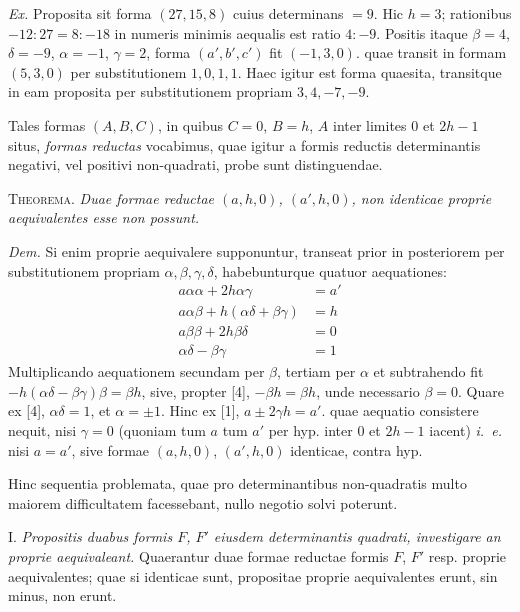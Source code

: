 \textit{Ex.} Proposita sit forma $(27,15,8)$ cuius determinans $=9$. Hic $h=3$; rationibus $-12:27=8:-18$ in numeris minimis aequalis est ratio $4:-9$. Positis itaque $\beta=4$, $\delta=-9$, $\alpha=-1$, $\gamma=2$, forma $(a',b',c')$ fit $(-1,3,0)$. quae transit in formam $(5,3,0)$ per substitutionem $1,0,1,1$. Haec igitur est
forma quaesita, transitque in eam proposita per substitutionem propriam $3,4,-7,-9$.

Tales formas $(A,B,C)$, in quibus $C=0$, $B=h$, $A$ inter limites $0$ et $2h-1$ situs, \textit{formas reductas} vocabimus, quae igitur a formis reductis determinantis negativi, vel positivi non-quadrati, probe sunt distinguendae.

\textsc{Theorema.} \textit{Duae formae reductae $(a,h,0)$, $(a',h,0)$, non identicae proprie aequivalentes esse non possunt.}

\textit{Dem.} Si enim proprie aequivalere supponuntur, transeat prior in posteriorem per substitutionem propriam $\alpha,\beta,\gamma,\delta$, habebunturque quatuor aequationes:
\begin{align*}
a\alpha\alpha+2h\alpha\gamma&=a'\tag*{. . . . . . . . . [1]}\\
a\alpha\beta+h(\alpha\delta+\beta\gamma)&=h\tag*{. . . . . . . [2]}\\
a\beta\beta+2h\beta\delta&=0\tag*{. . . . . . . . . . [3]}\\
\alpha\delta-\beta\gamma&=1\tag*{. . . . . . . . . . . [4]}
\end{align*}
Multiplicando aequationem secundam per $\beta$, tertiam per $\alpha$ et subtrahendo fit $-h(\alpha\delta-\beta\gamma)\beta=\beta h$, sive, propter [4], $-\beta h=\beta h$, unde necessario $\beta=0$. Quare ex [4], $\alpha\delta=1$, et $\alpha=\pm1$. Hinc ex [1], $a\pm2\gamma h=a'$. quae aequatio consistere nequit, nisi $\gamma=0$ (quoniam tum $a$ tum $a'$ per hyp. inter $0$ et $2h-1$ iacent) \textit{i.~e.} nisi $a=a'$, sive formae $(a,h,0)$, $(a',h,0)$ identicae, contra hyp.

Hinc sequentia problemata, quae pro determinantibus non-quadratis multo maiorem difficultatem facessebant, nullo negotio solvi poterunt.

I. \textit{Propositis duabus formis $F$, $F'$ eiusdem determinantis quadrati, investigare an proprie aequivaleant.} Quaerantur duae formae reductae formis $F$, $F'$ resp. proprie aequivalentes; quae si identicae sunt, propositae proprie aequivalentes erunt, sin minus, non erunt.

